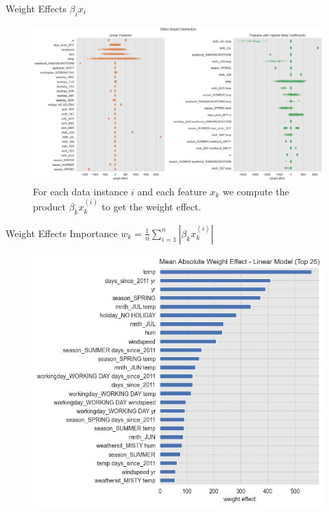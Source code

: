 \documentclass[10pt]{beamer}
\begin{document}
\begin{frame}{Weight Effects $\beta_{i}x_{i}$}
\begin{center}
  \begin{figure}
    \includegraphics[scale=0.3]{images/interpretable_ml_61_0.png}
    \caption{For each data instance $i$ and each feature $x_{k}$ we compute the product $\beta_{k}x^{(i)}_{k}$ to get the weight effect.}
  \end{figure}
\end{center}
\end{frame}

\begin{frame}{Weight Effects Importance $w_{k} = \frac{1}{n}\sum_{i=1}^{n}|\beta_{k}x_{k}^{(i)}|$}
\begin{center}
  \begin{figure}
    \includegraphics[scale=0.45]{images/interpretable_ml_62_0.png}
  \end{figure}
\end{center}
\end{frame}
\end{document}
